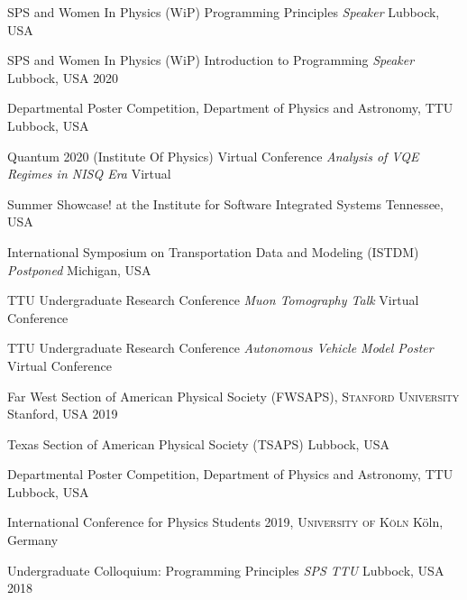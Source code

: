 \begin{cvhonors}
    \cvhonor
    {SPS and Women In Physics (WiP) Programming Principles}
    {\textit{\scriptsize Speaker}}
    {Lubbock, USA}
    {}

    \cvhonor
    {SPS and Women In Physics (WiP) Introduction to Programming}
    {\textit{\scriptsize Speaker}}
    {Lubbock, USA}
    {2020}

    \cvhonor
    {Departmental Poster Competition, Department of Physics and Astronomy, \textsc{TTU}}
    {}
    {Lubbock, USA}
    {}

    \cvhonor
    {Quantum 2020 (Institute Of Physics) Virtual Conference}
    {\textit{\scriptsize Analysis of VQE Regimes in NISQ Era}}
    {Virtual}
    {}

    \cvhonor
    {Summer Showcase! at the Institute for Software Integrated Systems}
    {}
    {Tennessee, USA}
    {}

    \cvhonor
    {International Symposium on Transportation Data and Modeling (ISTDM)}
    {\textit{\scriptsize Postponed}}
    {Michigan, USA}
    {}

    \cvhonor
    {\textsc{TTU} Undergraduate Research Conference}
    {\textit{\scriptsize Muon Tomography Talk}}
    {Virtual Conference}
    {}

    \cvhonor
    {\textsc{TTU} Undergraduate Research Conference}
    {\textit{\scriptsize Autonomous Vehicle Model Poster}}
    {Virtual Conference}
    {}

    \cvhonor
    {Far West Section of American Physical Society (FWSAPS), \textsc{Stanford University}}
    {}
    {Stanford, USA}
    {2019}

    \cvhonor
    {Texas Section of American Physical Society (TSAPS)}
    {}
    {Lubbock, USA}
    {}

    \cvhonor
    {Departmental Poster Competition, Department of Physics and Astronomy, \textsc{TTU}}
    {}
    {Lubbock, USA}
    {}

    \cvhonor
    {International Conference for Physics Students 2019, \textsc{University of Köln}}
    {}
    {Köln, Germany}
    {}

    \cvhonor
    {Undergraduate Colloquium: Programming Principles}
    {\textit{\scriptsize SPS \textsc{TTU}}}
    {Lubbock, USA}
    {2018}

\end{cvhonors}
